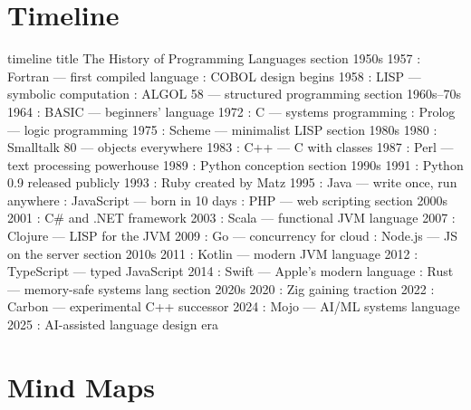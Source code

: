 \documentclass[12pt, a4paper]{article}
\begin{document}
\section{Timeline}

\begin{mermaid}[
    type    = timeline,
    theme   = ocean,
    caption = {History of programming languages — key milestones},
    label   = {fig:lang-history},
    width   = \linewidth
]
timeline
    title  The History of Programming Languages
    section 1950s
        1957 : Fortran — first compiled language
             : COBOL design begins
        1958 : LISP — symbolic computation
             : ALGOL 58 — structured programming
    section 1960s–70s
        1964 : BASIC — beginners' language
        1972 : C — systems programming
             : Prolog — logic programming
        1975 : Scheme — minimalist LISP
    section 1980s
        1980 : Smalltalk 80 — objects everywhere
        1983 : C++ — C with classes
        1987 : Perl — text processing powerhouse
        1989 : Python conception
    section 1990s
        1991 : Python 0.9 released publicly
        1993 : Ruby created by Matz
        1995 : Java — write once, run anywhere
             : JavaScript — born in 10 days
             : PHP — web scripting
    section 2000s
        2001 : C# and .NET framework
        2003 : Scala — functional JVM language
        2007 : Clojure — LISP for the JVM
        2009 : Go — concurrency for cloud
             : Node.js — JS on the server
    section 2010s
        2011 : Kotlin — modern JVM language
        2012 : TypeScript — typed JavaScript
        2014 : Swift — Apple's modern language
             : Rust — memory-safe systems lang
    section 2020s
        2020 : Zig gaining traction
        2022 : Carbon — experimental C++ successor
        2024 : Mojo — AI/ML systems language
        2025 : AI-assisted language design era
\end{mermaid}

\section{Mind Maps}
\end{document}
